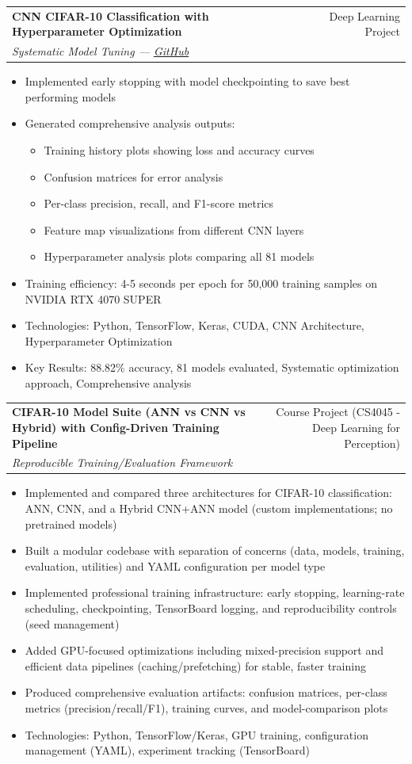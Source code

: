 \documentclass[a4paper,12pt]{article}
\makeatletter
\newenvironment{projectdetailed}[3]
    {
    \begin{tabularx}{\linewidth}{@{}l X r@{}}
    \textbf{#1} & \hfill & #2 \\
    \textit{#3} & & \\[3.75pt]
    \end{tabularx}
    \begin{minipage}[t]{\linewidth}
    \begin{itemize}[nosep,after=\strut, leftmargin=1em, itemsep=2pt,label=--]
    }
    {
    \end{itemize}
    \end{minipage}
    \vspace{6pt}
    }
\makeatother
\begin{document}
\begin{projectdetailed}{CNN CIFAR-10 Classification with Hyperparameter Optimization}{Deep Learning Project}{Systematic Model Tuning — \href{https://github.com/Umer-Farooq-CS/CNN-CIFAR10-Classification-GPU-Optimized}{GitHub}}
\item Implemented early stopping with model checkpointing to save best performing models
\item Generated comprehensive analysis outputs:
\begin{itemize}[nosep, leftmargin=2em]
    \item Training history plots showing loss and accuracy curves
    \item Confusion matrices for error analysis
    \item Per-class precision, recall, and F1-score metrics
    \item Feature map visualizations from different CNN layers
    \item Hyperparameter analysis plots comparing all 81 models
\end{itemize}
\item Training efficiency: 4-5 seconds per epoch for 50,000 training samples on NVIDIA RTX 4070 SUPER
\item Technologies: Python, TensorFlow, Keras, CUDA, CNN Architecture, Hyperparameter Optimization
\item Key Results: 88.82\% accuracy, 81 models evaluated, Systematic optimization approach, Comprehensive analysis
\end{projectdetailed}

\begin{projectdetailed}{CIFAR-10 Model Suite (ANN vs CNN vs Hybrid) with Config-Driven Training Pipeline}{Course Project (CS4045 - Deep Learning for Perception)}{Reproducible Training/Evaluation Framework}
\item Implemented and compared three architectures for CIFAR-10 classification: ANN, CNN, and a Hybrid CNN+ANN model (custom implementations; no pretrained models)
\item Built a modular codebase with separation of concerns (data, models, training, evaluation, utilities) and YAML configuration per model type
\item Implemented professional training infrastructure: early stopping, learning-rate scheduling, checkpointing, TensorBoard logging, and reproducibility controls (seed management)
\item Added GPU-focused optimizations including mixed-precision support and efficient data pipelines (caching/prefetching) for stable, faster training
\item Produced comprehensive evaluation artifacts: confusion matrices, per-class metrics (precision/recall/F1), training curves, and model-comparison plots
\item Technologies: Python, TensorFlow/Keras, GPU training, configuration management (YAML), experiment tracking (TensorBoard)
\end{projectdetailed}
\end{document}
